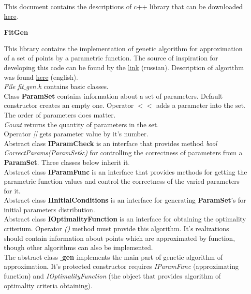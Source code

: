 \documentclass[a4paper]{article}
\begin{document}
This document contains the descriptions of c++ library that can be downloaded
\href{https://github.com/alexkernphysiker/FitGen}{here}.
\\
\begin{center}\Large \textbf{FitGen}\end{center}
This library contains the implementation of genetic algorithm for approximation of a set of points by a parametric function. 
The source of inspiration for developing this code can be found by the \href{http://habrahabr.ru/post/171751/}{link} (russian). 
Description of algorithm was found \href{http://www.drdobbs.com/database/differential-evolution/184410166}{here} (english).
\\
\textit{\Large File fit$\_$gen.h} contains basic classes.
\\
Class \textbf{ParamSet} contains information about a set of parameters. 
Default constructor creates an empty one.
Operator \textit{$<<$} adds a parameter into the set. The order of parameters does matter.\\
\textit{Count} returns the quantity of parameters in the set.\\
Operator \textit{[]} gets parameter value by it's number.\\
Abstract class \textbf{IParamCheck} is an interface that provides method \textit{bool CorrectParams(ParamSet$\&$)} for controlling the correctness of parameters from a \textbf{ParamSet}.
Three classes below inherit it.
\\
Abstract class \textbf{IParamFunc} is an interface that provides methods for getting the parametric function values and control the correctness of the varied parameters for it.
\\
Abstract class \textbf{IInitialConditions} is an interface for generating \textbf{ParamSet}'s for initial parameters distribution.
\\
Abstract class \textbf{IOptimalityFunction} is an interface for obtaining the optimality criterium.
Operator \textit{()} method must provide this algorithm. 
It's realizations should contain information about points which are approximated by function, though other algorithms can also be implemented.
\\
The abstract class \textbf{$\_$gen} implements the main part of genetic algorithm of approximation.
It's protected constructor requires \textit{IParamFunc} (approximating function) and \textit{IOptimalityFunction} (the object that provides algorithm of optimality criteria obtaining).
\end{document}
